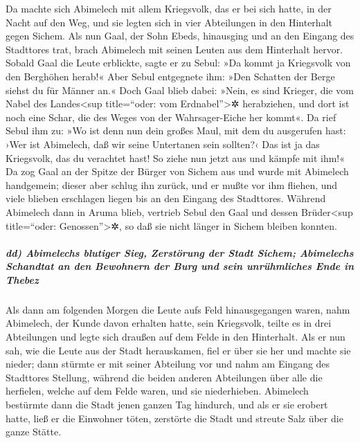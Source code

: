 Da machte sich Abimelech mit allem Kriegsvolk, das er bei
sich hatte, in der Nacht auf den Weg, und sie legten sich in vier
Abteilungen in den Hinterhalt gegen Sichem. Als nun Gaal,
der Sohn Ebeds, hinausging und an den Eingang des Stadttores trat, brach
Abimelech mit seinen Leuten aus dem Hinterhalt hervor.
Sobald Gaal die Leute erblickte, sagte er zu Sebul: »Da
kommt ja Kriegsvolk von den Berghöhen herab!« Aber Sebul entgegnete ihm:
»Den Schatten der Berge siehst du für Männer an.« Doch
Gaal blieb dabei: »Nein, es sind Krieger, die vom Nabel des
Landes\textless sup title=``oder: vom Erdnabel''\textgreater✲
herabziehen, und dort ist noch eine Schar, die des Weges von der
Wahrsager-Eiche her kommt«. Da rief Sebul ihm zu: »Wo ist
denn nun dein großes Maul, mit dem du ausgerufen hast: ›Wer ist
Abimelech, daß wir seine Untertanen sein sollten?‹ Das ist ja das
Kriegsvolk, das du verachtet hast! So ziehe nun jetzt aus und kämpfe mit
ihm!« Da zog Gaal an der Spitze der Bürger von Sichem aus
und wurde mit Abimelech handgemein; dieser aber schlug
ihn zurück, und er mußte vor ihm fliehen, und viele blieben erschlagen
liegen bis an den Eingang des Stadttores. Während
Abimelech dann in Aruma blieb, vertrieb Sebul den Gaal und dessen
Brüder\textless sup title=``oder: Genossen''\textgreater✲, so daß sie
nicht länger in Sichem bleiben konnten.

\hypertarget{dd-abimelechs-blutiger-sieg-zerstuxf6rung-der-stadt-sichem-abimelechs-schandtat-an-den-bewohnern-der-burg-und-sein-unruxfchmliches-ende-in-thebez}{%
\subparagraph{dd) Abimelechs blutiger Sieg, Zerstörung der Stadt Sichem;
Abimelechs Schandtat an den Bewohnern der Burg und sein unrühmliches
Ende in
Thebez}\label{dd-abimelechs-blutiger-sieg-zerstuxf6rung-der-stadt-sichem-abimelechs-schandtat-an-den-bewohnern-der-burg-und-sein-unruxfchmliches-ende-in-thebez}}

Als dann am folgenden Morgen die Leute aufs Feld
hinausgegangen waren, nahm Abimelech, der Kunde davon erhalten hatte,
sein Kriegsvolk, teilte es in drei Abteilungen und legte
sich draußen auf dem Felde in den Hinterhalt. Als er nun sah, wie die
Leute aus der Stadt herauskamen, fiel er über sie her und machte sie
nieder; dann stürmte er mit seiner Abteilung vor und nahm
am Eingang des Stadttores Stellung, während die beiden anderen
Abteilungen über alle die herfielen, welche auf dem Felde waren, und sie
niederhieben. Abimelech bestürmte dann die Stadt jenen
ganzen Tag hindurch, und als er sie erobert hatte, ließ er die Einwohner
töten, zerstörte die Stadt und streute Salz über die ganze Stätte.

